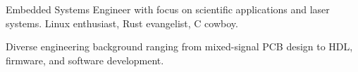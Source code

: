 

\begin{cvparagraph}

	Embedded Systems Engineer with focus on scientific applications and laser systems. \textrm{Linux} enthusiast, \textrm{Rust} evangelist, \textrm{C} cowboy.

	Diverse engineering background ranging from mixed-signal PCB design to \textrm{HDL}, firmware, and software development.
\end{cvparagraph}
